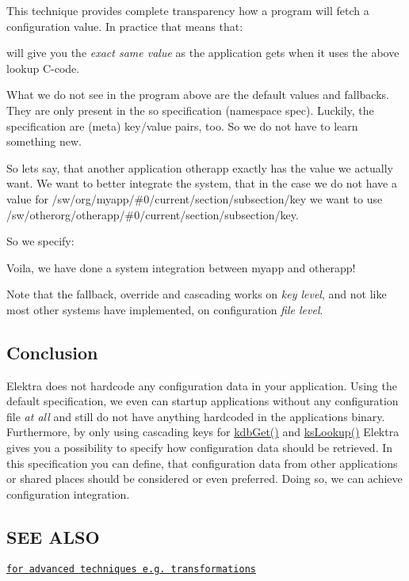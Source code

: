 This technique provides complete transparency how a program will fetch a configuration value. In practice that means that\+: 


will give you the {\itshape exact same value} as the application gets when it uses the above lookup C-\/code.

What we do not see in the program above are the default values and fallbacks. They are only present in the so specification (namespace {\ttfamily spec}). Luckily, the specification are (meta) key/value pairs, too. So we do not have to learn something new.

So lets say, that another application {\ttfamily otherapp} exactly has the value we actually want. We want to better integrate the system, that in the case we do not have a value for {\ttfamily /sw/org/myapp/\#0/current/section/subsection/key} we want to use {\ttfamily /sw/otherorg/otherapp/\#0/current/section/subsection/key}.

So we specify\+: 


Voila, we have done a system integration between {\ttfamily myapp} and {\ttfamily otherapp}!

Note that the fallback, override and cascading works on {\itshape key level}, and not like most other systems have implemented, on configuration {\itshape file level}.

\subsection*{Conclusion}

Elektra does not hardcode any configuration data in your application. Using the {\ttfamily default} specification, we even can startup applications without any configuration file {\itshape at all} and still do not have anything hardcoded in the applications binary. Furthermore, by only using cascading keys for {\ttfamily \hyperlink{group__kdb_ga28e385fd9cb7ccfe0b2f1ed2f62453a1}{kdb\+Get()}} and {\ttfamily \hyperlink{group__keyset_gaa34fc43a081e6b01e4120daa6c112004}{ks\+Lookup()}} Elektra gives you a possibility to specify how configuration data should be retrieved. In this specification you can define, that configuration data from other applications or shared places should be considered or even preferred. Doing so, we can achieve configuration integration.

\subsection*{S\+E\+E A\+L\+S\+O}


\begin{DoxyItemize}
\item \href{http://www.libelektra.org/ftp/papers/kps2015sharing.pdf}{\tt for advanced techniques e.\+g. transformations} 
\end{DoxyItemize}
